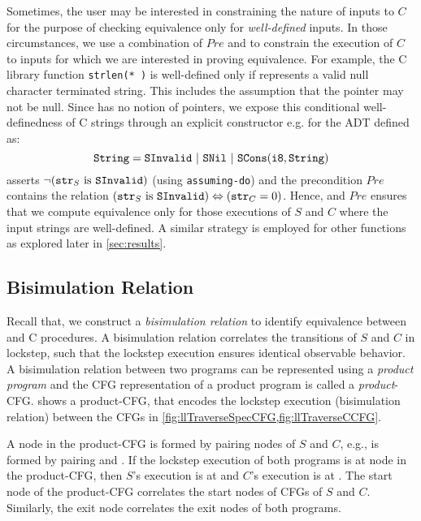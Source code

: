 Sometimes, the user may be interested in constraining the nature of inputs to $C$
for the purpose of checking equivalence only for {\em well-defined} inputs.
In those circumstances, we use a combination of $Pre$ and \sdef{} to constrain
the execution of $C$ to inputs for which we are interested in proving equivalence.
For example, the C library function {\tt strlen(* )} is well-defined only if 
represents a valid null character terminated string.
This includes the assumption that the pointer  may not be null.
Since \SpecL{} has no notion of pointers, we expose this conditional well-definedness of C strings
through an explicit constructor e.g.  for the  ADT defined as:
$$
\type{String}=\cons{SInvalid}\ |\ \cons{SNil}\ |\ \cons{SCons}(\type{i8}, \type{String})
$$
\sdef{} asserts $\neg({\tt str}_{S}\ \mathrm{is}\ {\tt SInvalid})$ (using {\tt assuming-do}) and
the precondition $Pre$ contains the relation $({\tt str}_{S}\ \mathrm{is}\ {\tt SInvalid}) \Leftrightarrow ({\tt str}_{C}=0)$.
Hence, \sdef{} and $Pre$ ensures that we compute equivalence only for those
executions of $S$ and $C$ where the input strings are well-defined.
A similar strategy is employed for other functions as explored later in \cref{sec:results}.



\subsection{Bisimulation Relation}
\label{sec:bisim}
Recall that,
we construct a {\em bisimulation relation} to identify equivalence between \SpecL{} and C procedures.
A bisimulation relation correlates the transitions of $S$ and $C$ in lockstep, such that the
lockstep execution ensures identical observable behavior.
A bisimulation relation between two programs can be represented using a {\em product program}
\cite{covac} and the CFG representation of a product program is called a {\em product}-CFG.
 shows a product-CFG, that encodes the lockstep execution
(bisimulation relation) between the CFGs in \cref{fig:llTraverseSpecCFG,fig:llTraverseCCFG}.

A node in the product-CFG is formed by pairing nodes of $S$ and $C$,
e.g.,  is formed by pairing  and .
If the lockstep execution of both programs is at node  in the product-CFG,
then $S$'s execution is at  and $C$'s execution is at .
The start node  of the product-CFG correlates the start nodes of CFGs of $S$ and $C$.
Similarly, the exit node  correlates the exit nodes of both programs.

